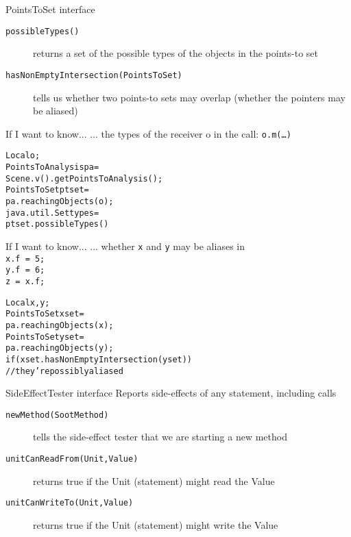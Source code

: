 \begin{slide}{PointsToSet interface}
\begin{description}
\item [\texttt{\small possibleTypes()}] returns a set of the possible types of the
objects in the points-to set
\item [\texttt{\small hasNonEmptyIntersection(PointsToSet)}] tells us whether
two points-to sets may overlap (whether the pointers may be aliased)
\end{description}
\end{slide}

\begin{slide}{If I want to know...}
... the types of the receiver o in the call: \texttt{o.m(\ldots)}\\
\hspace{10mm}
\begin{alltt}
Local o;
PointsToAnalysis pa =
     Scene.v().getPointsToAnalysis();
PointsToSet ptset = 
     pa.reachingObjects( o );
java.util.Set types =
     ptset.possibleTypes()
\end{alltt}
\end{slide}

\begin{slide}{If I want to know...}
... whether \texttt{x} and \texttt{y} may be aliases in\\
\texttt{x.f = 5;\\ y.f = 6;\\ z = x.f;}\\
\hspace{10mm}
\begin{alltt}
Local x, y;
PointsToSet xset =
    pa.reachingObjects( x );
PointsToSet yset =
    pa.reachingObjects( y );
if(xset.hasNonEmptyIntersection(yset))
    // they're possibly aliased
\end{alltt}
\end{slide}

\begin{slide}{SideEffectTester interface}
Reports side-effects of any statement, including calls
\begin{description}
\item [\texttt{newMethod(SootMethod)}] tells the side-effect tester that
we are starting a new method
\item [\texttt{unitCanReadFrom(Unit,Value)}]
returns true if the Unit (statement) might read the Value
\item [\texttt{unitCanWriteTo(Unit,Value)}]
returns true if the Unit (statement) might write the Value
\end{description}
\end{slide}

